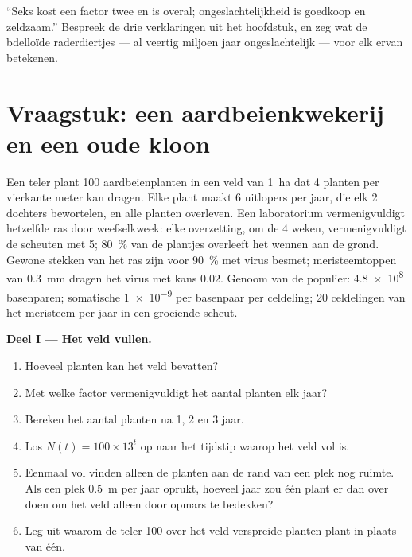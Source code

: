 \begin{exercise}[$\star\star\star$]\label{exo:b2:asexual-reproduction:12}
``Seks kost een factor twee en is overal; ongeslachtelijkheid is goedkoop
en zeldzaam.'' Bespreek de drie verklaringen uit het hoofdstuk, en zeg wat
de bdelloïde raderdiertjes --- al veertig miljoen jaar ongeslachtelijk ---
voor elk ervan betekenen.
\end{exercise}

\section{Vraagstuk: een aardbeienkwekerij en een oude kloon}

\begin{problem}
\label{pb:b2:asexual-reproduction:1}
Een teler plant \num{100} aardbeienplanten in een veld van
\qty{1}{ha} dat \num{4} planten per vierkante meter kan dragen. Elke
plant maakt \num{6} uitlopers per jaar, die elk \num{2} dochters
bewortelen, en alle planten overleven. Een laboratorium vermenigvuldigt
hetzelfde ras door weefselkweek: elke overzetting, om de \num{4} weken,
vermenigvuldigt de scheuten met \num{5}; \qty{80}{\%} van de plantjes
overleeft het wennen aan de grond. Gewone stekken van het ras zijn voor
\qty{90}{\%} met virus besmet; meristeemtoppen van \qty{0.3}{mm} dragen het
virus met kans
$0.02$. Genoom van de populier: \qty{4.8e8}{} basenparen; somatische
 \qty{1e-9}{} per basenpaar per celdeling; \num{20}
celdelingen van het meristeem per jaar in een groeiende scheut.

\medskip
\noindent\textbf{Deel I --- Het veld vullen.}
\begin{enumerate}
  \item Hoeveel planten kan het veld bevatten?
  \item Met welke factor vermenigvuldigt het aantal planten elk jaar?
  \item Bereken het aantal planten na 1, 2 en 3 jaar.
  \item Los $N(t) = 100\times 13^{t}$ op naar het tijdstip waarop het veld
        vol is.
  \item Eenmaal vol vinden alleen de planten aan de rand van een plek nog
        ruimte. Als een plek \qty{0.5}{m} per jaar oprukt, hoeveel jaar zou
        één plant er dan over doen om het veld alleen door opmars te
        bedekken?
  \item Leg uit waarom de teler \num{100} over het veld verspreide planten
        plant in plaats van één.
\end{enumerate}


\end{problem}
